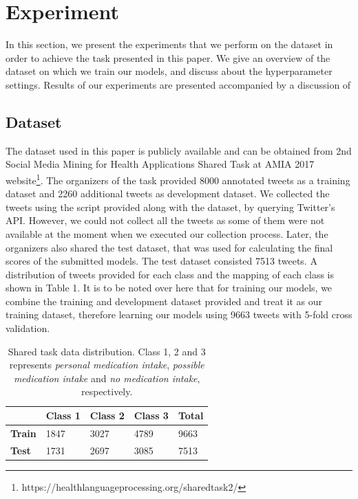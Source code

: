\documentclass[conference]{IEEEtran}
\begin{document}
\section{Experiment} 
In this section, we present the experiments that we perform on the dataset in order to achieve the task presented in this paper. We give an overview of the dataset on which we train our models, and discuss about the hyperparameter settings. Results of our experiments are presented accompanied by a discussion of 
\subsection{Dataset \label{dataset}}
The dataset used in this paper is publicly available and can be obtained from 2nd Social Media Mining for Health Applications Shared Task at AMIA 2017 website\footnote{https://healthlanguageprocessing.org/sharedtask2/}.
The organizers of the task provided 8000 annotated tweets as a training dataset and 2260 additional tweets as development dataset. We collected the tweets using the script provided along with the dataset, by querying Twitter’s API. However, we could not collect all the tweets as some of them were not available at the moment when we executed our collection process. Later, the organizers also shared the test dataset, that was used for calculating the final scores of the submitted models. The test dataset consisted 7513 tweets. A distribution of tweets provided for each class and the mapping of each class is shown in Table 1. It is to be noted over here that for training our models, we combine the training and development dataset provided and treat it as our training dataset, therefore learning our models using 9663 tweets with 5-fold cross validation.

\begin{table}[htbp]
\centering
\tabcolsep=0.10cm
\begin{tabular}{|l|l|l|l|l|}
\hline
 & \textbf{Class 1} & \textbf{Class 2} & \textbf{Class 3} & \textbf{Total} \\ \hline
\textbf{Train} & 1847 & 3027 & 4789 & 9663 \\ \hline
\textbf{Test} & 1731 & 2697 & 3085 & 7513 \\ \hline
\end{tabular}
\caption{Shared task data distribution. Class 1, 2 and 3 represents \textit{personal medication intake}, \textit{possible medication intake} and \textit{no medication intake}, respectively.}
\label{dataset}
\end{table}
\end{document}
